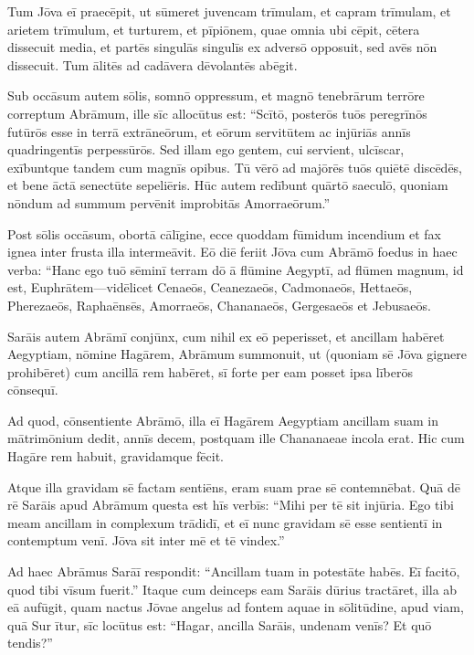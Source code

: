 \Versus Tum Jōva eī praecēpit, ut sūmeret juvencam trīmulam, et capram trīmulam, et arietem trīmulum, et turturem, et pīpiōnem,
\Versus quae omnia ubi cēpit, cētera dissecuit media, et partēs singulās singulīs ex adversō opposuit, sed avēs nōn dissecuit.
\Versus Tum ālitēs ad cadāvera dēvolantēs abēgit.

\Versus Sub occāsum autem sōlis, somnō oppressum, et magnō tenebrārum terrōre correptum Abrāmum, ille sīc allocūtus est:
\Versus ``Scītō, posterōs tuōs peregrīnōs futūrōs esse in terrā extrāneōrum, et eōrum servitūtem ac injūriās annīs quadringentīs perpessūrōs.
\Versus Sed illam ego gentem, cui servient, ulcīscar, exībuntque tandem cum magnīs opibus.
\Versus Tū vērō ad majōrēs tuōs quiētē discēdēs, et bene āctā senectūte sepeliēris.
\Versus Hūc autem redībunt quārtō saeculō, quoniam  nōndum ad summum pervēnit improbitās Amorraeōrum.''

\Versus Post sōlis occāsum, obortā cālīgine, ecce quoddam fūmidum incendium et fax ignea inter frusta illa intermeāvit.
\Versus Eō diē feriit Jōva cum Abrāmō foedus in haec verba: ``Hanc ego tuō sēminī terram dō ā flūmine Aegyptī, ad flūmen magnum, id est, Euphrātem—\Versus vidēlicet Cenaeōs, Ceanezaeōs, Cadmonaeōs,
\Versus Hettaeōs, Pherezaeōs, Raphaēnsēs,
\Versus Amorraeōs, Chananaeōs, Gergesaeōs et Jebusaeōs.



\Caput
\Versus Sarāis autem Abrāmī conjūnx, cum nihil ex eō peperisset, et ancillam habēret Aegyptiam, nōmine Hagārem,
\Versus Abrāmum summonuit, ut (quoniam sē Jōva gignere prohibēret) cum ancillā rem habēret, sī forte per eam posset ipsa līberōs cōnsequī.

Ad quod, cōnsentiente Abrāmō,
\Versus illa eī Hagārem Aegyptiam ancillam suam in mātrimōnium dedit, annīs decem, postquam ille Chananaeae incola erat.
\Versus Hic cum Hagāre rem habuit, gravidamque fēcit.

Atque illa gravidam sē factam sentiēns, eram suam prae sē contemnēbat.
\Versus Quā dē rē Sarāis apud Abrāmum questa est hīs verbīs: ``Mihi per tē sit injūria. Ego tibi meam ancillam in complexum trādidī, et eī nunc gravidam sē esse sentientī in contemptum venī. Jōva sit inter mē et tē vindex.''

\Versus Ad haec Abrāmus Sarāī respondit: ``Ancillam tuam in potestāte habēs. Eī facitō, quod tibi vīsum fuerit.'' Itaque cum deinceps eam Sarāis dūrius tractāret, illa ab eā aufūgit,
\Versus quam nactus Jōvae angelus ad fontem aquae in sōlitūdine, apud viam, quā Sur ītur,
\Versus sīc locūtus est: ``Hagar, ancilla Sarāis, undenam venīs? Et quō tendis?''

